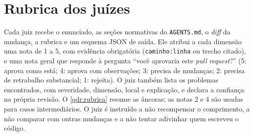 
\section{Rubrica dos juízes}
\label{apd:rubrica}

Cada juiz recebe o enunciado, as seções normativas do \texttt{AGENTS.md}, o
\textit{diff} da mudança, a rubrica e um esquema JSON de saída. Ele atribui a
cada dimensão uma nota de 1 a 5, com evidência obrigatória
(\texttt{caminho:linha} ou trecho citado), e uma nota geral que responde à
pergunta ``você aprovaria este \textit{pull request}?'' (5: aprova como está;
4: aprova com observações; 3: precisa de mudanças; 2: precisa de retrabalho
substancial; 1: rejeita). O juiz também lista os problemas encontrados, com
severidade, dimensão, local e explicação, e declara a confiança na própria
revisão. O \autoref{qdr:rubrica} resume as âncoras; as notas 2 e 4 são usadas
para casos intermediários. O juiz é instruído a não recompensar o comprimento,
a não comparar com outras mudanças e a não tentar adivinhar quem escreveu o
código.

